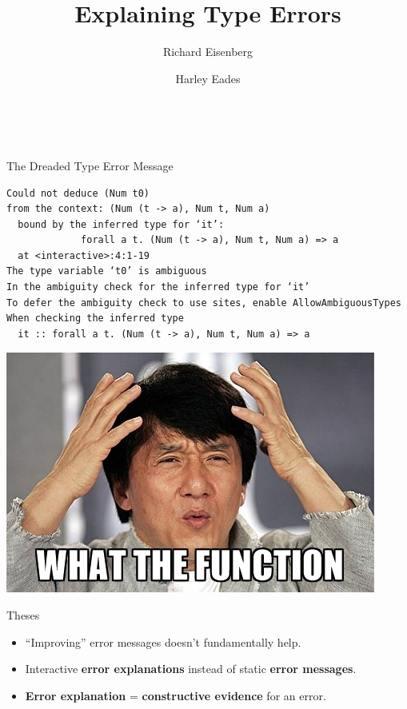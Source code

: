 \documentclass[xcolor=svgnames,12pt,aspectratio=169]{beamer}
\title{Explaining Type Errors}
\date{\theschool \\ \thedate}
\author{\usebeamercolor[fg]{title}{Brent Yorgey} \and Richard
  Eisenberg \and Harley Eades}
\newenvironment{xframe}[1][]
  {\begin{frame}[fragile,environment=xframe,#1]}
  {\end{frame}}
\renewcommand{\emph}{\textbf}
\begin{document}
\begin{xframe}{}
   \titlepage
\end{xframe}

\begin{xframe}{The Dreaded Type Error Message}
\footnotesize
\begin{verbatim}
Could not deduce (Num t0)
from the context: (Num (t -> a), Num t, Num a)
  bound by the inferred type for ‘it’:
             forall a t. (Num (t -> a), Num t, Num a) => a
  at <interactive>:4:1-19
The type variable ‘t0’ is ambiguous
In the ambiguity check for the inferred type for ‘it’
To defer the ambiguity check to use sites, enable AllowAmbiguousTypes
When checking the inferred type
  it :: forall a t. (Num (t -> a), Num t, Num a) => a
\end{verbatim}
\end{xframe}

\begin{xframe}{}
  \begin{center}
    \includegraphics{what-the-function.jpg}
  \end{center}
\end{xframe}

\begin{xframe}{Theses}
  \begin{itemize}
  \item ``Improving'' error messages doesn't fundamentally help.
  \item Interactive \emph{error explanations} instead of static
    \emph{error messages}.
  \item \emph{Error explanation} = \emph{constructive evidence} for
    an error.
  \end{itemize}
\end{xframe}
\end{document}
